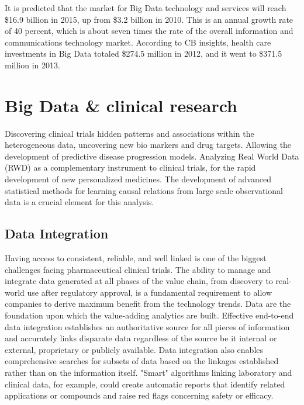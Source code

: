 \documentclass[sigconf]{acmart}
\begin{document}
It is predicted that the market for Big Data technology and services
will reach \$16.9 billion in 2015, up from \$3.2 billion in 2010. 
This is an annual growth rate of 40 percent, which is about seven 
times the rate of the overall information and communications 
technology market. According to CB insights, health care investments
in Big Data totaled \$274.5 million in 2012, and it went to \$371.5 
million in 2013. \cite{TR03}

\section{Big Data \& clinical research}
Discovering clinical trials hidden patterns and associations within
the heterogeneous data, uncovering new bio markers and drug targets.
Allowing the development of predictive disease progression models.
Analyzing Real World Data (RWD) as a complementary instrument to 
clinical trials, for the rapid development of new personalized 
medicines. The development of advanced statistical methods for 
learning causal relations from large scale observational data is a
crucial element for this analysis. \cite{TR04}

\subsection{Data Integration}
Having access to consistent, reliable, and well linked is one 
of the biggest challenges facing pharmaceutical clinical trials. The
ability to manage and integrate data generated at all phases of the
value chain, from discovery to real-world use after regulatory 
approval, is a fundamental requirement to allow companies to derive
maximum benefit from the technology trends. Data are the foundation
upon which the value-adding analytics are built. Effective end-to-end
data integration establishes an authoritative source for all pieces of
information and accurately links disparate data regardless of the 
source be it internal or external, proprietary or publicly available.
Data integration also enables comprehensive searches for subsets of
data based on the linkages established rather than on the information
itself. "Smart" algorithms linking laboratory and clinical data, for
example, could create automatic reports that identify related 
applications or compounds and raise red flags concerning safety or 
efficacy. \cite{TR02}
\end{document}
